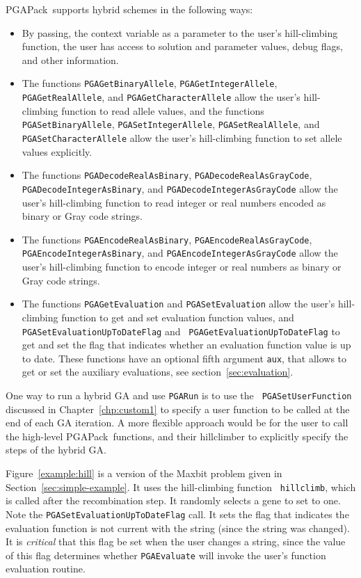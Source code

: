 \documentclass{report}
\newcommand{\pga}{PGAPack}
\begin{document}
\pga\ supports hybrid schemes in the following ways:
\begin{sloppypar}
\begin{itemize}
\item By passing, the context variable as a parameter to the user's
hill-climbing function, the user has access to solution and parameter values,
debug flags, and other information.
\item The functions {\tt PGAGetBinaryAllele}, {\tt PGAGetIntegerAllele},
{\tt PGAGetRealAllele}, and {\tt PGAGetCharacterAllele} allow the user's 
hill-climbing function to read allele values, and the functions {\tt
PGASetBinaryAllele}, {\tt PGASetIntegerAllele}, {\tt PGASetRealAllele}, and
{\tt PGASetCharacterAllele} allow the user's hill-climbing function to set
allele values explicitly.
\item The functions
{\tt PGADecodeRealAsBinary}, {\tt PGADecodeRealAsGrayCode}, {\tt
PGADecodeIntegerAsBinary}, and {\tt PGADecodeIntegerAsGrayCode} allow the
user's hill-climbing function to read integer or real numbers encoded as
binary or Gray code strings.
\item The functions
{\tt PGAEncodeRealAsBinary}, {\tt PGAEncodeRealAsGrayCode}, {\tt
PGAEncodeIntegerAsBinary}, and {\tt PGAEncodeIntegerAsGrayCode} allow the
user's hill-climbing function to encode integer or real numbers as binary or
Gray code strings.
\item The functions {\tt PGAGetEvaluation} and {\tt PGASetEvaluation} allow the
user's hill-climbing function to get and set evaluation function values, and
{\tt PGASetEvaluationUpToDateFlag} and {\tt
PGAGetEvaluationUpToDateFlag} to get and set the flag that indicates
whether an evaluation function value is up to date.
These functions have an optional fifth argument \verb+aux+, that allows
to get or set the auxiliary evaluations, see section~\ref{sec:evaluation}.
\end{itemize}
\end{sloppypar}

One way to run a hybrid GA and use {\tt PGARun} is to use the {\tt
PGASetUserFunction} discussed in Chapter~\ref{chp:custom1} to specify a user
function to be called at the end of each GA iteration.  A more flexible
approach would be for the user to call the high-level \pga\ functions, and
their hillclimber to explicitly specify the steps of the hybrid GA.

Figure~\ref{example:hill} is a version of the Maxbit problem given in
Section~\ref{sec:simple-example}.  It uses the hill-climbing function {\tt
hillclimb}, which is called after the recombination step.  It randomly selects
a gene to set to one.  Note the {\tt PGASetEvaluationUpToDateFlag} call.  It
sets the flag that indicates the evaluation function is not current with the
string (since the string was changed).  It is {\em critical} that this flag be
set when the user changes a string, since the value of this flag
determines whether {\tt PGAEvaluate} will invoke the user's function
evaluation routine.
\end{document}
